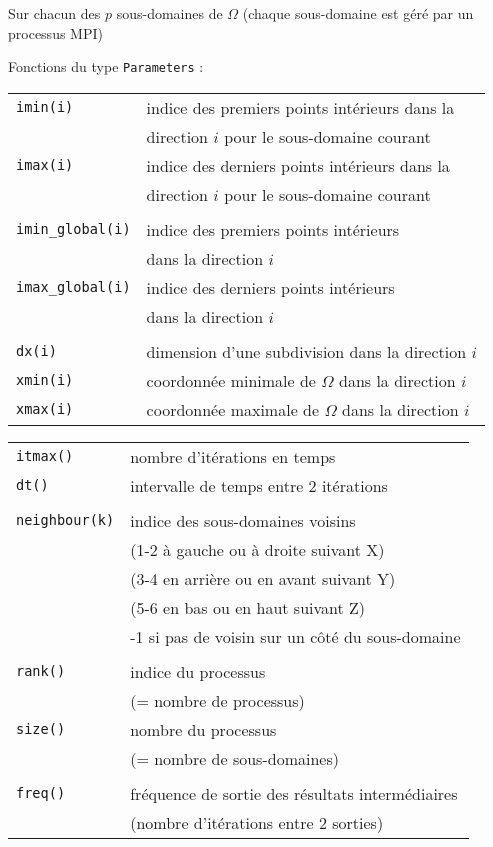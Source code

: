\documentclass{beamer}
\begin{document}
\begin{frame}

Sur chacun des $p$ sous-domaines de $\Omega$ (chaque sous-domaine est géré par un processus MPI)
\bigskip

	Fonctions du type {\tt Parameters} :
	\bigskip
	
	\begin{tabular}{ll}
		{\tt imin(i)}& indice des premiers points intérieurs dans la \\ &  direction $i$ pour le sous-domaine courant \\
		{\tt imax(i)}& indice des derniers points intérieurs dans la \\ & direction $i$ pour le sous-domaine courant\\ \\
		{\tt imin\_global(i)}& indice des premiers points intérieurs \\ &  dans la direction $i$ \\
		{\tt imax\_global(i)}& indice des derniers points intérieurs \\ & dans la direction $i$ \\ \\
		{\tt dx(i)} & dimension d'une subdivision dans la direction $i$\\
		{\tt xmin(i)} & coordonnée minimale de $\Omega$ dans la direction $i$ \\
		{\tt xmax(i)} & coordonnée maximale de $\Omega$ dans la direction $i$ \\
	\end{tabular}
	
\end{frame}


\begin{frame}
	\begin{tabular}{ll}
		{\tt itmax()} & nombre d'itérations en temps \\
		{\tt dt()} & intervalle de temps entre 2 itérations \\ \\
		{\tt neighbour(k)} & indice des sous-domaines voisins \\
                 & (1-2 à gauche ou à droite suivant X) \\
                 & (3-4 en arrière ou en avant suivant Y) \\
                 & (5-6 en bas ou en haut suivant Z) \\ 
                 & -1 si pas de voisin sur un côté du sous-domaine \\ \\
		{\tt rank()} & indice du processus \\ & (= nombre de processus)\\
		{\tt size()} & nombre du processus \\ & (= nombre de sous-domaines) \\ \\ 
		{\tt freq()} & fréquence de sortie des résultats intermédiaires \\
		& (nombre d'itérations entre 2 sorties)
	\end{tabular}
	
\end{frame}
\end{document}

